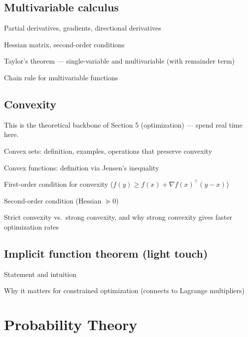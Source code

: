 \documentclass[11pt]{article}
\newcommand{\note}[1]{\textcolor{gray!70!black}{\small #1}}
\begin{document}
\subsection{Multivariable calculus}
\begin{tasklist}
    \item Partial derivatives, gradients, directional derivatives
    \item Hessian matrix, second-order conditions
    \item Taylor's theorem — single-variable and multivariable (with remainder term)
    \item Chain rule for multivariable functions
\end{tasklist}

\subsection{Convexity}
\note{This is the theoretical backbone of Section 5 (optimization) — spend real time here.}
\begin{tasklist}
    \item Convex sets: definition, examples, operations that preserve convexity
    \item Convex functions: definition via Jensen's inequality
    \item First-order condition for convexity ($f(y) \ge f(x) + \nabla f(x)^\top (y-x)$)
    \item Second-order condition (Hessian $\succeq 0$)
    \item Strict convexity vs.\ strong convexity, and why strong convexity gives faster optimization rates
\end{tasklist}

\subsection{Implicit function theorem (light touch)}
\begin{tasklist}
    \item Statement and intuition
    \item Why it matters for constrained optimization (connects to Lagrange multipliers)
\end{tasklist}

\section{Probability Theory}
\end{document}
